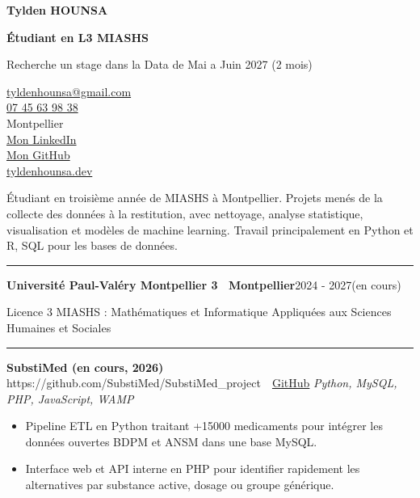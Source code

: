 \documentclass[10pt,a4paper]{article}
\newcommand{\sect}[1]{%
  \vspace{9pt}\par
  {\color{accent}\small\bfseries\textls[120]{\MakeUppercase{#1}}}\par
  \vspace{-2.5pt}
  {\color{accent}\rule{\linewidth}{0.4pt}}\par
  \vspace{3.5pt}}
\newcommand{\entry}[2]{\textbf{#1}\hfill #2\par}
\newcommand{\proj}[3]{\textbf{#1}%
  \ifx\relax#2\relax\else\ \textcolor{accent}{\textbar}\ \href{#2}{GitHub}\fi
  \hfill{\small\itshape #3}\par}
\begin{document}
\raggedright

\begin{minipage}[t]{0.56\linewidth}
  {\fontsize{25}{27}\selectfont\bfseries Tylden HOUNSA}\par
  \vspace{12pt}
  {\color{accent}\bfseries Étudiant en L3 MIASHS}\par
  Recherche un stage dans la Data de Mai a Juin 2027 (2 mois)\par
\end{minipage}\hfill
\begin{minipage}[t]{0.42\linewidth}\raggedleft\small
  \href{mailto:tyldenhounsa@gmail.com}{tyldenhounsa@gmail.com}\\
  \href{tel:+33745639838}{07 45 63 98 38}\\
  Montpellier\\
  \href{https://www.linkedin.com/in/tylden-hounsa}{Mon LinkedIn}\\
  \href{https://github.com/Ashborn539}{Mon GitHub}\\
  \href{https://tyldenhounsa.dev}{tyldenhounsa.dev}
\end{minipage}

\vspace{9pt}

Étudiant en troisième année de MIASHS à Montpellier. Projets menés de la collecte des données à la restitution, avec nettoyage, analyse statistique, visualisation et modèles de machine learning. Travail principalement en Python et R, SQL pour les bases de données.

\sect{Formation}
\entry{Université Paul-Valéry Montpellier 3 \textcolor{accent}{\textbar}\ Montpellier}{2024 - 2027(en cours)}
Licence 3 MIASHS : Mathématiques et Informatique Appliquées aux Sciences Humaines et Sociales\par

\sect{Projets}
\proj{SubstiMed (en cours, 2026)}{https://github.com/SubstiMed/SubstiMed_project}{Python, MySQL, PHP, JavaScript, WAMP}
\begin{itemize}
  \item Pipeline ETL en Python traitant +15000 medicaments pour intégrer les données ouvertes BDPM et ANSM dans une base MySQL.
  \item Interface web et API interne en PHP pour identifier rapidement les alternatives par substance active, dosage ou groupe générique.
\end{itemize}
\vspace{5pt}
\end{document}
